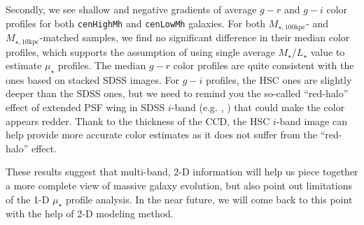 \documentclass[a4paper,fleqn,usenatbib]{mnras}
\def\rbcg{\texttt{cenHighMh}}
\def\nbcg{\texttt{cenLowMh}}
\def\mstar{{$M_{\star}$}}
\def\minn{{$M_{\star,10\mathrm{kpc}}$}}
\def\mtot{{$M_{\star,100\mathrm{kpc}}$}}
\def\m2l{{$M_{\star}/L_{\star}$}}
\def\mden{{$\mu_{\star}$}}
\begin{document}
    Secondly, we see shallow and negative gradients of average $g-r$ and $g-i$ color 
    profiles for both \rbcg{} and \nbcg{} galaxies. 
    For both \mtot{}- and \minn{}-matched samples, we find no significant difference
    in their median color profiles, which supports the assumption of using single 
    average \m2l{} value to estimate \mden{} profiles.
    The median $g-r$ color profiles are quite consistent with the ones based on 
    stacked SDSS images. 
    For $g-i$ profiles, the HSC ones are slightly deeper than the SDSS ones, but we 
    need to remind you the so-called ``red-halo'' effect of extended PSF wing in 
    SDSS $i$-band (e.g. \citealt{Wu2005}, \citealt{Tal2011}) that could make the 
    color appears redder.
    Thank to the thickness of the CCD, the HSC $i$-band image can help provide more 
    accurate color estimates as it does not suffer from the ``red-halo'' effect.
    
    These results suggest that multi-band, 2-D information will help us piece together
    a more complete view of massive galaxy evolution, but also point out limitations 
    of the 1-D \mden{} profile analysis. 
    In the near future, we will come back to this point with the help of 2-D modeling
    method. 
    
    

        
\end{document}
